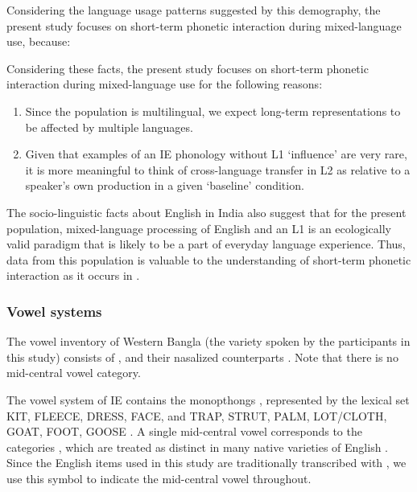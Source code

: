 \documentclass[charis,linguex]{glossa}
\newcommand{\nt}[1]{\textipa{[#1]}} %
\begin{document}
Considering the language usage patterns suggested by this demography, the present study focuses on short-term phonetic interaction during mixed-language use, because:

Considering these facts, the present study focuses on short-term phonetic interaction during mixed-language use for the following reasons:

\begin{enumerate}[label=(\roman*)]
	\item Since the population is multilingual, we expect long-term representations to be affected by multiple languages. 
	\item Given that examples of an IE phonology without L1 `influence' are very rare, it is more meaningful to think of cross-language transfer in L2 as relative to a speaker's own production in a given `baseline' condition.
\end{enumerate}

The socio-linguistic facts about English in India also suggest that for the present population, mixed-language processing of English and an L1 is an ecologically valid paradigm that is likely to be a part of everyday language experience. Thus, data from this population is valuable to the understanding of short-term phonetic interaction as it occurs in .

\subsubsection{Vowel systems} \label{vowel systems}
The vowel inventory of Western Bangla (the variety spoken by the participants in this study) consists of \nt{i, e, \ae, a, O, o, u}, and their nasalized counterparts \citep{garry2001facts}. Note that there is no mid-central vowel category. 


The vowel system of IE contains the monopthongs \nt{I, i, E, e, \ae, @/2, a:, O, o, U, u}, represented by the lexical set KIT, FLEECE, DRESS, FACE, and TRAP, STRUT, PALM, LOT/CLOTH, GOAT, FOOT, GOOSE \citep{wells1982accents, masica1972sound}. %
A single mid-central vowel corresponds to the categories \nt{2,@,3:}, which are treated as distinct in many native varieties of English \citep{nihalani1979indian,wells1982accents,hickey2005legacies,bansal1969intelligibility}. Since the English items used in this study are traditionally transcribed with \nt{2}, we use this symbol to indicate the mid-central vowel throughout. 
 
\end{document}

